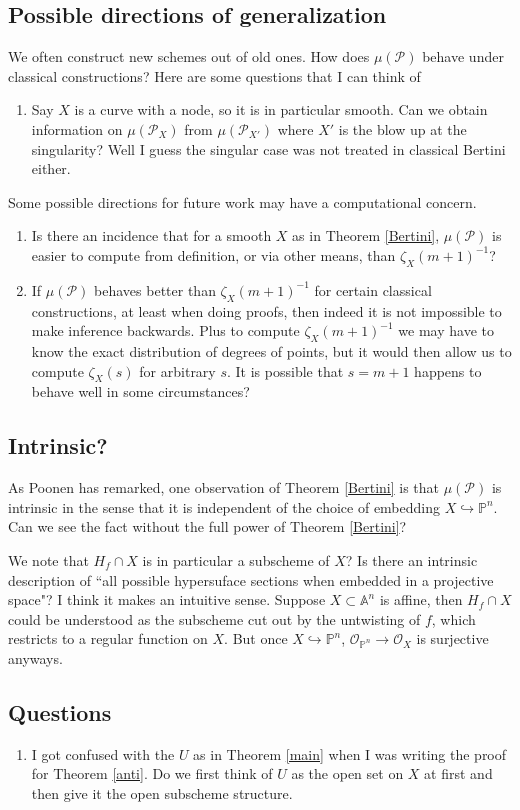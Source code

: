 \documentclass[12pt]{article}
\theoremstyle{plain}
\theoremstyle{definition}
\newcommand{\IA}{\mathbb{A}}
\newcommand{\IP}{\mathbb{P}}
\newcommand{\sO}{\mathcal{O}}
\newcommand{\sP}{\mathcal{P}}
\newcommand{\<}{\langle}
\renewcommand{\>}{\rangle}
\newcommand{\into}{\hookrightarrow}
\begin{document}
\subsection{Possible directions of generalization}
We often construct new schemes out of old ones. How does $\mu(\sP)$ behave under classical constructions? Here are some questions that I can think of 
\begin{enumerate}
\item Say $X$ is a curve with a node, so it is in particular smooth. Can we obtain information on $\mu(\sP_X)$ from $\mu(\sP_{X'})$ where $X'$ is the blow up at the singularity? Well I guess the singular case was not treated in classical Bertini either. 
\end{enumerate}
Some possible directions for future work may have a computational concern. 
\begin{enumerate}
\item Is there an incidence that for a smooth $X$ as in Theorem \ref{Bertini}, $\mu(\sP)$ is easier to compute from definition, or via other means, than $\zeta_X(m + 1)^{-1}$?
\item If $\mu(\sP)$ behaves better than $\zeta_X(m+1)^{-1}$ for certain classical constructions, at least when doing proofs, then indeed it is not impossible to make inference backwards. Plus to compute $\zeta_X(m+1)^{-1}$ we may have to know the exact distribution of degrees of points, but it would then allow us to compute $\zeta_X(s)$ for arbitrary $s$. It is possible that $s = m + 1$ happens to behave well in some circumstances?
\end{enumerate}

\subsection{Intrinsic?}
As Poonen has remarked, one observation of Theorem \ref{Bertini} is that $\mu(\sP)$ is intrinsic in the sense that it is independent of the choice of embedding $X \into \IP^n$. 
Can we see the fact without the full power of Theorem \ref{Bertini}?

We note that $H_f \cap X$ is in particular a subscheme of $X$? Is there an intrinsic description of ``all possible hypersuface sections when embedded in a projective space"? I think it makes an intuitive sense. Suppose $X \subset \IA^n$ is affine, then $H_f \cap X$ could be understood as the subscheme cut out by the untwisting of $f$, which restricts to a regular function on $X$. But once $X \into \IP^n$, $\sO_{\IP^n} \to \sO_X$ is surjective anyways.  
\subsection{Questions}
\begin{enumerate}
\item I got confused with the $U$ as in Theorem \ref{main} when I was writing the proof for Theorem \ref{anti}. Do we first think of $U$ as the open set on $X$ at first and then give it the open subscheme structure. 
\end{enumerate}
\end{document}

